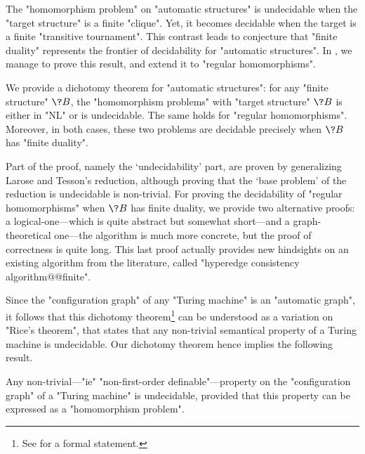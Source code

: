 The "homomorphism problem" on "automatic structures" 
is undecidable when the "target structure" is a finite "clique".
Yet, it becomes decidable when the target is a finite "transitive tournament".
This contrast leads to conjecture that "finite duality" represents the frontier of decidability for "automatic structures". In , we manage to prove this result, and extend it to "regular homomorphisms".

\begin{contribution}
	We provide a dichotomy theorem for "automatic structures":
	for any "finite structure" $\?B$, the "homomorphism problems" with "target structure" $\?B$
	is either in "NL" or is undecidable. The same holds for "regular homomorphisms".
	Moreover, in both cases, these two problems are decidable precisely when $\?B$ has "finite duality".
\end{contribution}

Part of the proof, namely the `undecidability' part, are proven
by generalizing Larose and Tesson's reduction, although proving that the
`base problem' of the reduction is undecidable is non-trivial.
For proving the decidability of "regular homomorphisms" when $\?B$ has finite duality,
we provide two alternative proofs: a logical-one---which is quite abstract but somewhat short---and
a graph-theoretical one---the algorithm is much more concrete, but the proof of correctness is 
quite long. This last proof actually provides new hindsights on an existing algorithm from the literature, called "hyperedge consistency algorithm@@finite".

Since the "configuration graph" of any "Turing machine" is an "automatic graph",
it follows that this dichotomy theorem\footnote{See  for a formal statement.} can be understood
as a variation on "Rice's theorem", that states that any non-trivial
semantical property of a Turing machine is undecidable.
Our dichotomy theorem hence implies the following result.

\begin{contribution}
	Any non-trivial---"ie" "non-first-order definable"---property on the "configuration graph"
	of a "Turing machine" is undecidable, provided that this property can be expressed
	as a "homomorphism problem".
\end{contribution}

